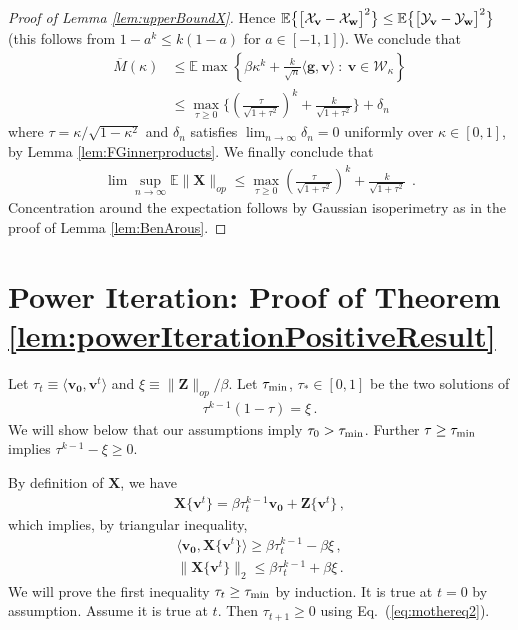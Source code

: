 \documentclass[11pt]{article}
\theoremstyle{definition}
\def\oM{\overline{M}}
\def\<{\langle}
\def\>{\rangle}
\def\E{{\mathbb E}} %
\def\bv{\mathbf{v}}
\def\bg{\mathbf{g}}
\def\bw{\mathbf{w}}
\def\bvz{\mathbf{v_0}}
\def\bX{\mathbf{X}}
\def\bZ{\mathbf{Z}}
\def\cW{\mathcal{W}}
\def\E{\mathbb{E}}
\def\cX{{\cal X}}
\def\cY{{\cal Y}}
\begin{document}
\begin{proof}[Proof of Lemma \ref{lem:upperBoundX}]
Hence $\E\big\{\big[\cX_\bv-\cX_\bw\big]^2\big\}\le
\E\big\{\big[\cY_\bv-\cY_\bw\big]^2\big\}$
(this follows from $1-a^k\le k(1-a)$ for $a\in [-1,1]$). We conclude
that
%
\begin{align}
%
\oM(\kappa)
&\le\E \max \left \{  \beta \kappa^k +\frac k {\sqrt n}    \langle \bg , \bv\rangle ~:~\bv \in \cW_{\kappa}
\right \}\\
&\le\max_{\tau\geq 0} \Big\{\left (\frac {\tau}{\sqrt {1+\tau^2}} \right )^k + \frac{k}{\sqrt{1+\tau^2}} \Big\}+ \delta_n
%
\end{align}
%
where $\tau= \kappa / \sqrt{1-\kappa^2}$ and $\delta_n$ satisfies
$\lim_{n\to \infty} \delta_n = 0$ uniformly over $\kappa \in [0,1]$,
by Lemma \ref{lem:FGinnerproducts}.
We finally conclude that 
%
\begin{align}
 \lim \sup_{n \to \infty} \E \|\bX\|_{op} \leq\max_{\tau\geq 0} \left
   (\frac{\tau}{\sqrt {1+\tau^2}} \right )^k +
 \frac{k}{\sqrt{1+\tau^2}}~~.
\end{align}
%
Concentration around the expectation follows by Gaussian isoperimetry as in the proof of Lemma \ref{lem:BenArous}.
%
\end{proof}


\section{Power Iteration: Proof of Theorem \ref{lem:powerIterationPositiveResult} }


Let $\tau_t \equiv \<\bvz,\bv^t\>$ and $\xi\equiv
\|\bZ\|_{op}/\beta$. 
Let $\tau_{\rm min}$, $\tau_{*}\in [0,1]$ be the two solutions
of 
%
\begin{align}
%
\tau^{k-1}(1-\tau) = \xi\, .
%
\end{align}
%
We will show below that  our assumptions imply $\tau_0>\tau_{\rm min}$. Further
$\tau\ge \tau_{\rm min}$ implies 
$\tau^{k-1}-\xi\ge 0$.

By 
definition of $\bX$, we have
%
\begin{align}\label{eq:mothereq}
%
\bX\{ \bv^t\} = \beta \tau_t^{k-1} \bvz + \bZ\{\bv^t\} \,,
%
\end{align}
%
which implies, by triangular inequality,
%
\begin{align}
%
\<\bvz,\bX\{ \bv^t\}\> \ge  \beta \tau_t^{k-1} -\beta\xi \,, \label{eq:mothereq2}\\
\|\bX\{ \bv^t\}\|_2 \le   \beta \tau_t^{k-1}  +\beta\xi  \, . \label{eq:mothereq3}
%
\end{align}
%
We will prove the first inequality  $\tau_t \geq \tau_{\rm min}$ by induction. It is true at $t = 0$ by assumption.
Assume it is true at $t$. Then $\tau_{t+1}\geq 0$ using Eq.~(\ref{eq:mothereq2}).
\end{document}
